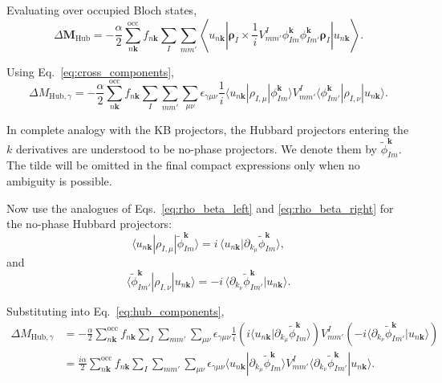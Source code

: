\documentclass[11pt]{article}
\begin{document}
Evaluating over occupied Bloch states,
\begin{equation}
\Delta \mathbf{M}_{\mathrm{Hub}}
=
-\frac{\alpha}{2}
\sum_{n\mathbf{k}}^{\mathrm{occ}} f_{n\mathbf{k}}
\sum_I \sum_{mm'}
\left\langle u_{n\mathbf{k}} \left|
\bm{\rho}_I \times \frac{1}{i}
V_{mm'}^I
{\phi_{Im}^{\mathbf{k}}}{\phi_{Im'}^{\mathbf{k}}}
\bm{\rho}_I
\right| u_{n\mathbf{k}} \right\rangle .
\label{eq:hub_exp}
\end{equation}

Using Eq.~\eqref{eq:cross_components},
\begin{equation}
\Delta M_{\mathrm{Hub},\gamma}
=
-\frac{\alpha}{2}
\sum_{n\mathbf{k}}^{\mathrm{occ}} f_{n\mathbf{k}}
\sum_I \sum_{mm'} \sum_{\mu\nu}
\epsilon_{\gamma\mu\nu}
\frac{1}{i}
\langle u_{n\mathbf{k}} | \rho_{I,\mu} | \phi_{Im}^{\mathbf{k}} \rangle
V_{mm'}^I
\langle \phi_{Im'}^{\mathbf{k}} | \rho_{I,\nu} | u_{n\mathbf{k}} \rangle .
\label{eq:hub_components}
\end{equation}

In complete analogy with the KB projectors, the Hubbard projectors
entering the $k$ derivatives are understood to be no-phase projectors.
We denote them by $\widetilde{\phi}_{Im}^{\mathbf{k}}$. The tilde will
be omitted in the final compact expressions only when no ambiguity is
possible.

Now use the analogues of Eqs.~\eqref{eq:rho_beta_left} and
\eqref{eq:rho_beta_right} for the no-phase Hubbard projectors:
\begin{equation}
\langle u_{n\mathbf{k}} | \rho_{I,\mu} |
\widetilde{\phi}_{Im}^{\mathbf{k}} \rangle
=
i \,
\langle u_{n\mathbf{k}} |
\partial_{k_\mu} \widetilde{\phi}_{Im}^{\mathbf{k}} \rangle ,
\label{eq:rho_phi_left}
\end{equation}
and
\begin{equation}
\langle \widetilde{\phi}_{Im'}^{\mathbf{k}} |
\rho_{I,\nu} | u_{n\mathbf{k}} \rangle
=
- i \,
\langle
\partial_{k_\nu} \widetilde{\phi}_{Im'}^{\mathbf{k}}
| u_{n\mathbf{k}} \rangle .
\label{eq:rho_phi_right}
\end{equation}

Substituting into Eq.~\eqref{eq:hub_components},
\begin{align}
\Delta M_{\mathrm{Hub},\gamma}
&=
-\frac{\alpha}{2}
\sum_{n\mathbf{k}}^{\mathrm{occ}} f_{n\mathbf{k}}
\sum_I \sum_{mm'} \sum_{\mu\nu}
\epsilon_{\gamma\mu\nu}
\frac{1}{i}
\left(
i \langle u_{n\mathbf{k}} |
\partial_{k_\mu} \widetilde{\phi}_{Im}^{\mathbf{k}} \rangle
\right)
V_{mm'}^I
\left(
- i \langle
\partial_{k_\nu} \widetilde{\phi}_{Im'}^{\mathbf{k}}
| u_{n\mathbf{k}} \rangle
\right)
\nonumber\\
&=
\frac{i \alpha}{2}
\sum_{n\mathbf{k}}^{\mathrm{occ}} f_{n\mathbf{k}}
\sum_I \sum_{mm'} \sum_{\mu\nu}
\epsilon_{\gamma\mu\nu}
\langle u_{n\mathbf{k}} |
\partial_{k_\mu} \widetilde{\phi}_{Im}^{\mathbf{k}} \rangle
V_{mm'}^I
\langle
\partial_{k_\nu} \widetilde{\phi}_{Im'}^{\mathbf{k}}
| u_{n\mathbf{k}} \rangle .
\label{eq:hub_before_im}
\end{align}
\end{document}
